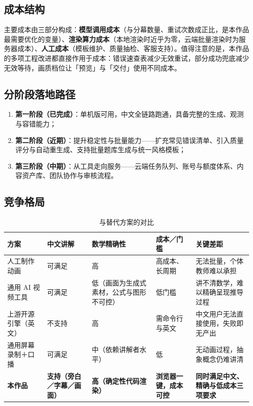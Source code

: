\documentclass[11pt,a4paper]{ctexart}
\begin{document}
\subsection{成本结构}

主要成本由三部分构成：\textbf{模型调用成本}（与分幕数量、重试次数成正比，是本作品最需要优化的变量）、\textbf{渲染算力成本}（本地渲染时近乎为零，云端批量渲染时为服务器成本）、\textbf{人工成本}（模板维护、质量抽检、客服支持）。值得注意的是，本作品的多项工程改进都直接作用于成本：错误速查表减少无效重试，部分成功兜底减少无效等待，画质档位让「预览」与「交付」使用不同成本。

\subsection{分阶段落地路径}

\begin{enumerate}
  \item \textbf{第一阶段（已完成）}：单机版可用，中文全链路跑通，具备完整的生成、观测与容错能力；
  \item \textbf{第二阶段（近期）}：提升稳定性与批量能力——扩充常见错误清单、引入质量评分与自动重生成、支持批量题库生成与统一风格模板；
  \item \textbf{第三阶段（中期）}：从工具走向服务——云端任务队列、账号与额度体系、内容资产库、团队协作与审核流程。
\end{enumerate}

\subsection{竞争格局}

\begin{table}[htbp]
\centering
\small
\caption{与替代方案的对比}
\begin{tabularx}{\textwidth}{@{}p{2.9cm} p{2.6cm} p{2.4cm} p{2.5cm} X@{}}
\toprule
\textbf{方案} & \textbf{中文讲解} & \textbf{数学精确性} & \textbf{成本／门槛} & \textbf{关键差距} \\
\midrule
人工制作动画 & 可满足 & 高 & 高成本、长周期 & 无法批量，个体教师难以承担 \\
通用 AI 视频工具 & 可满足 & 低（画面为生成式素材，公式与图形不可控） & 低门槛 & 讲不清数学，难以精确呈现推导过程 \\
上游开源引擎（英文） & 不支持 & 高 & 需命令行与英文 & 中文用户无法直接使用，失败即无产出 \\
通用屏幕录制＋口播 & 可满足 & 中（依赖讲解者水平） & 低 & 无动画过程，抽象概念仍难讲清 \\
\textbf{本作品} & \textbf{支持（旁白／字幕／画面）} & \textbf{高（确定性代码渲染）} & \textbf{浏览器一键，成本可控} & \textbf{同时满足中文、精确与低成本三项要求} \\
\bottomrule
\end{tabularx}
\end{table}
\end{document}

